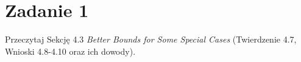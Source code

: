 \section{Zadanie 1}
Przeczytaj Sekcję 4.3 \textit{Better Bounds for Some Special Cases} (Twierdzenie
4.7, Wnioski 4.8-4.10 oraz ich dowody).
